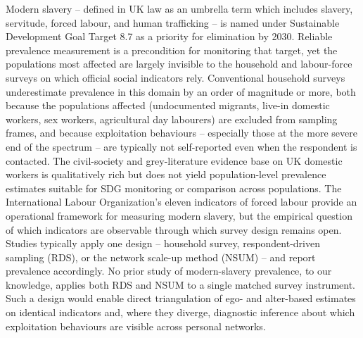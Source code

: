 \documentclass[
  12pt,
  letterpaper,
  DIV=11,
  numbers=noendperiod]{scrartcl}
\begin{document}
Modern slavery -- defined in UK law as an umbrella term which includes
slavery, servitude, forced labour, and human trafficking -- is named
under Sustainable Development Goal Target 8.7 as a priority for
elimination by 2030. Reliable prevalence measurement is a precondition
for monitoring that target, yet the populations most affected are
largely invisible to the household and labour-force surveys on which
official social indicators rely. Conventional household surveys
underestimate prevalence in this domain by an order of magnitude or
more, both because the populations affected (undocumented migrants,
live-in domestic workers, sex workers, agricultural day labourers) are
excluded from sampling frames, and because exploitation behaviours --
especially those at the more severe end of the spectrum -- are typically
not self-reported even when the respondent is contacted. The
civil-society and grey-literature evidence base on UK domestic workers
\autocite{kala08-new,serv23-closed} is qualitatively rich but does not
yield population-level prevalence estimates suitable for SDG monitoring
or comparison across populations. The International Labour
Organization's eleven indicators of forced labour
\autocite{ILO11-indicators,int25-ilo} provide an operational framework
for measuring modern slavery, but the empirical question of which
indicators are observable through which survey design remains open.
Studies typically apply one design -- household survey,
respondent-driven sampling (RDS), or the network scale-up method (NSUM)
-- and report prevalence accordingly. No prior study of modern-slavery
prevalence, to our knowledge, applies both RDS and NSUM to a single
matched survey instrument. Such a design would enable direct
triangulation of ego- and alter-based estimates on identical indicators
and, where they diverge, diagnostic inference about which exploitation
behaviours are visible across personal networks.
\end{document}
